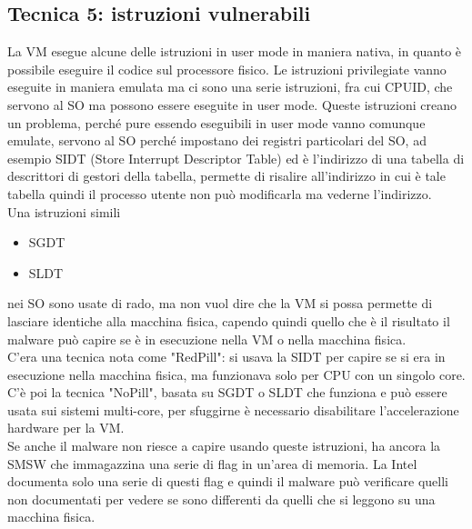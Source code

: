 \documentclass[12pt, oneside]{extbook}
\begin{document}
\subsection{Tecnica 5: istruzioni vulnerabili}
La VM esegue alcune delle istruzioni in user mode in maniera nativa, in quanto è possibile eseguire il codice sul processore fisico. Le istruzioni privilegiate vanno eseguite in maniera emulata ma ci sono una serie istruzioni, fra cui CPUID, che servono al SO ma possono essere eseguite in user mode. Queste istruzioni creano un problema, perché pure essendo eseguibili in user mode vanno comunque emulate, servono al SO perché impostano dei registri particolari del SO, ad esempio SIDT (Store Interrupt Descriptor Table) ed è l'indirizzo di una tabella di descrittori di gestori della tabella, permette di risalire all'indirizzo in cui è tale tabella quindi il processo utente non può modificarla ma vederne l'indirizzo.\\Una istruzioni simili
\begin{itemize}
\item SGDT
\item SLDT
\end{itemize}
nei SO sono usate di rado, ma non vuol dire che la VM si possa permette di lasciare identiche alla macchina fisica, capendo quindi quello che è il risultato il malware può capire se è in esecuzione nella VM o nella macchina fisica.\\C'era una tecnica nota come "RedPill": si usava la SIDT per capire se si era in esecuzione nella macchina fisica, ma funzionava solo per CPU con un singolo core.\\C'è poi la tecnica "NoPill", basata su SGDT o SLDT che funziona e può essere usata sui sistemi multi-core, per sfuggirne è necessario disabilitare l'accelerazione hardware per la VM.\\Se anche il malware non riesce a capire usando queste istruzioni, ha ancora la SMSW che immagazzina una serie di flag in un'area di memoria. La Intel documenta solo una serie di questi flag e quindi il malware può verificare quelli non documentati per vedere se sono differenti da quelli che si leggono su una macchina fisica.
\end{document}
